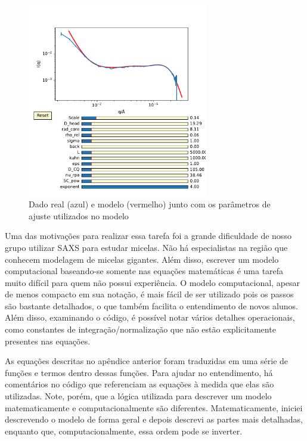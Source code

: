 \begin{apendicesenv}
\begin{figure}[h]
	\centering
	\includegraphics[width=0.7\textwidth]{imagens/saxs/Modelo_dado_SAXS_python}
	\caption{Dado real (azul) e modelo (vermelho) junto com os parâmetros de ajuste utilizados no modelo}
	\label{fig:saxs_modelo_dado_saxs_python}
\end{figure}

Uma das motivações para realizar essa tarefa foi a grande dificuldade de nosso grupo utilizar SAXS para estudar micelas. Não há especialistas na região que conhecem modelagem de micelas gigantes. Além disso, escrever um modelo computacional baseando-se somente nas equações matemáticas é uma tarefa muito difícil para quem não possui experiência. O modelo computacional, apesar de menos compacto em sua notação, é mais fácil de ser utilizado pois os passos são bastante detalhados, o que também facilita o entendimento de novos alunos. Além disso, examinando o código, é possível notar vários detalhes operacionais, como constantes de integração/normalização que não estão explicitamente presentes nas equações.

As equações descritas no apêndice anterior foram traduzidas em uma série de funções e termos dentro dessas funções. Para ajudar no entendimento, há comentários no código que referenciam as equações à medida que elas são utilizadas. Note, porém, que a lógica utilizada para descrever um modelo matematicamente e computacionalmente são diferentes. Matematicamente, iniciei descrevendo o modelo de forma geral e depois descrevi as partes mais detalhadas, enquanto que, computacionalmente, essa ordem pode se inverter.


\end{apendicesenv}
